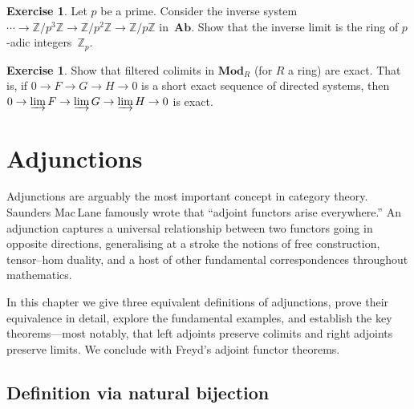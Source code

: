 \documentclass[a4paper,12pt]{book}
\newcommand{\Ab}{\mathbf{Ab}}
\newcommand{\Mod}{\mathbf{Mod}}
\newcommand{\Z}{\mathbb{Z}}
\theoremstyle{definition}
\newtheorem{exercise}[definition]{Exercise}
\theoremstyle{plain}
\theoremstyle{remark}
\begin{document}
\begin{exercise}\label{exer:inverse-limit-abelian-groups}
Let $p$ be a prime.  Consider the inverse system
$\cdots\to\Z/p^3\Z\to\Z/p^2\Z\to\Z/p\Z$
in~$\Ab$.  Show that the inverse limit is the ring of
$p$-adic integers~$\Z_p$.
\end{exercise}

\begin{exercise}\label{exer:filtered-colim-exact}
Show that filtered colimits in $\Mod_R$ (for $R$ a ring) are exact.
That is, if $0\to F\to G\to H\to 0$ is a short exact sequence
of directed systems, then
$0\to\varinjlim F\to\varinjlim G\to\varinjlim H\to 0$ is exact.
\end{exercise}


\newpage


\chapter{Adjunctions}\label{ch:adjunctions}
\minitoc

\vspace{1em}

Adjunctions are arguably the most important concept in category theory.
Saunders Mac\,Lane famously wrote that ``adjoint functors arise everywhere.''
An adjunction captures a universal relationship between two functors
going in opposite directions, generalising at a stroke the notions of
free construction, tensor--hom duality, and a host of other fundamental
correspondences throughout mathematics.

In this chapter we give three equivalent definitions of adjunctions,
prove their equivalence in detail, explore the fundamental examples,
and establish the key theorems---most notably, that left adjoints
preserve colimits and right adjoints preserve limits.  We conclude
with Freyd's adjoint functor theorems.


\section{Definition via natural bijection}\label{sec:adj-hom-def}
\end{document}
